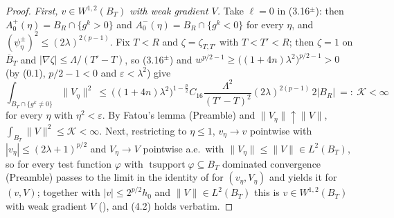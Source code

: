 \begin{proof}
\emph{First, $v\in W^{1,2}(B_T)$ with weak gradient $V$.}  Take $\ell=0$ in
(3.16$^\pm$): then $A^+_0(\eta)=B_R\cap\{g^k>0\}$ and
$A^-_0(\eta)=B_R\cap\{g^k<0\}$ for every $\eta$, and
$(\psi_\eta^{\pm})^2\le(2\lambda)^{2(p-1)}$.  Fix $T<R$ and
$\zeta=\zeta_{T,T'}$ with $T<T'<R$; then $\zeta=1$ on $\overline B_T$ and
$|\nabla\zeta|\le\Lambda/(T'-T)$, so (3.16$^\pm$) and
$w^{p/2-1}\ge\bigl((1+4n)\lambda^2\bigr)^{p/2-1}>0$ (by (0.1), $p/2-1<0$ and
$\varepsilon<\lambda^2$) give
\[
\int_{B_T\cap\{g^k\ne0\}}\|V_\eta\|^2
\ \le\ \bigl((1+4n)\lambda^2\bigr)^{1-\frac p2}C_{16}
\frac{\Lambda^2}{(T'-T)^2}(2\lambda)^{2(p-1)}\,2|B_R|\ =:\ \mathcal K<\infty
\]
for every $\eta$ with $\eta^2<\varepsilon$.  By Fatou's lemma (Preamble) and
$\|V_\eta\|\uparrow\|V\|$, $\int_{B_T}\|V\|^2\le\mathcal K<\infty$.  Next, restricting to $\eta\le1$,
$v_\eta\to v$ pointwise with $|v_\eta|\le(2\lambda+1)^{p/2}$ and
$V_\eta\to V$ pointwise a.e.\ with $\|V_\eta\|\le\|V\|\in L^2(B_T)$, so for
every test function $\varphi$ with $\operatorname{tsupport}\varphi\subseteq B_T$
dominated convergence (Preamble) passes to the limit in the identity of
 for $(v_\eta,V_\eta)$ and yields it for $(v,V)$;
together with $|v|\le2^{p/2}h_0$ and $\|V\|\in L^2(B_T)$ this is
$v\in W^{1,2}(B_T)$ with weak gradient $V$ (), and (4.2)
holds verbatim.


\end{proof}
